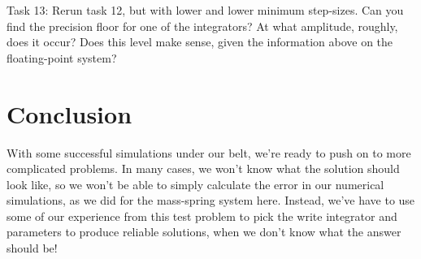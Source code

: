 \documentclass[main.tex]{subfiles}
\begin{document}
Task 13:
Rerun task 12, but with lower and lower minimum step-sizes.  
Can you find the precision floor for one of the integrators?  
At what amplitude, roughly, does it occur?  
Does this level make sense, given the information above on the floating-point system?

\section{Conclusion}

With some successful simulations under our belt, we're ready to push on to more complicated problems.  
In many cases, we won't know what the solution should look like, so we won't be able to simply calculate the error in our numerical simulations, as we did for the mass-spring system here.  
Instead, we've have to use some of our experience from this test problem to pick the write integrator and parameters to produce reliable solutions, when we don't know what the answer should be!
\end{document}
